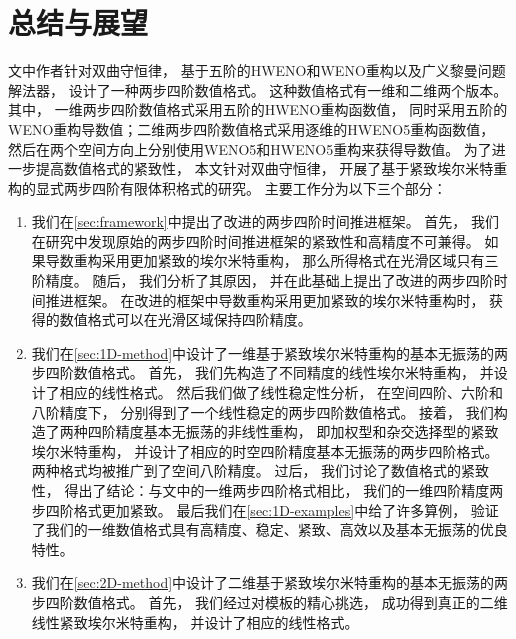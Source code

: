 \chapter{总结与展望}
\label{sec:summary}

文\cite{du2018hermite}中作者针对双曲守恒律，
基于五阶的HWENO和WENO重构以及广义黎曼问题解法器，
设计了一种两步四阶数值格式。
这种数值格式有一维和二维两个版本。
其中，
一维两步四阶数值格式采用五阶的HWENO重构函数值，
同时采用五阶的WENO重构导数值；二维两步四阶数值格式采用逐维的HWENO5重构函数值，
然后在两个空间方向上分别使用WENO5和HWENO5重构来获得导数值。
为了进一步提高数值格式的紧致性，
本文针对双曲守恒律，
开展了基于紧致埃尔米特重构的显式两步四阶有限体积格式的研究。
主要工作分为以下三个部分：
\begin{enumerate}
      \item 我们在\cref{sec:framework}中提出了改进的两步四阶时间推进框架。
            首先，
            我们在研究中发现原始的两步四阶时间推进框架的紧致性和高精度不可兼得。
            如果导数重构采用更加紧致的埃尔米特重构，
            那么所得格式在光滑区域只有三阶精度。
            随后，
            我们分析了其原因，
            并在此基础上提出了改进的两步四阶时间推进框架。
            在改进的框架中导数重构采用更加紧致的埃尔米特重构时，
            获得的数值格式可以在光滑区域保持四阶精度。
      \item 我们在\cref{sec:1D-method}中设计了一维基于紧致埃尔米特重构的基本无振荡的两步四阶数值格式。
            首先，
            我们先构造了不同精度的线性埃尔米特重构，
            并设计了相应的线性格式。
            然后我们做了线性稳定性分析，
            在空间四阶、六阶和八阶精度下，
            分别得到了一个线性稳定的两步四阶数值格式。
            接着，
            我们构造了两种四阶精度基本无振荡的非线性重构，
            即加权型和杂交选择型的紧致埃尔米特重构，
            并设计了相应的时空四阶精度基本无振荡的两步四阶格式。
            两种格式均被推广到了空间八阶精度。
            过后，
            我们讨论了数值格式的紧致性，
            得出了结论：与文\cite{du2018hermite}中的一维两步四阶格式相比，
            我们的一维四阶精度两步四阶格式更加紧致。
            最后我们在\cref{sec:1D-examples}中给了许多算例，
            验证了我们的一维数值格式具有高精度、稳定、紧致、高效以及基本无振荡的优良特性。
      \item 我们在\cref{sec:2D-method}中设计了二维基于紧致埃尔米特重构的基本无振荡的两步四阶数值格式。
            首先，
            我们经过对模板的精心挑选，
            成功得到真正的二维线性紧致埃尔米特重构，
            并设计了相应的线性格式。

\end{enumerate}
